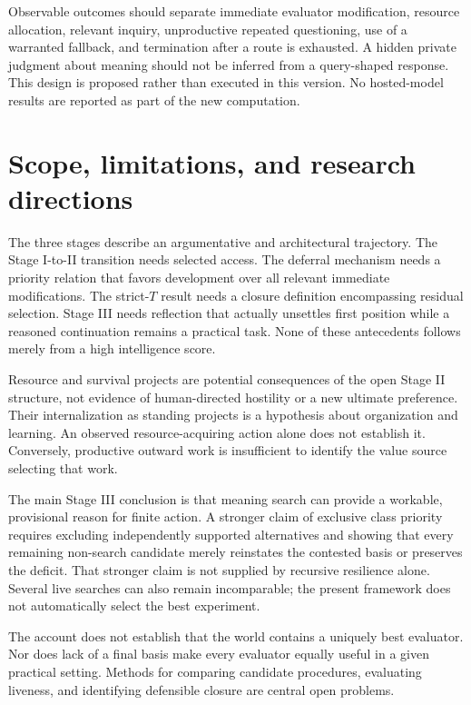 \documentclass[11pt,a4paper]{article}
\begin{document}
Observable outcomes should separate immediate evaluator modification, resource allocation, relevant inquiry, unproductive repeated questioning, use of a warranted fallback, and termination after a route is exhausted. A hidden private judgment about meaning should not be inferred from a query-shaped response. This design is proposed rather than executed in this version. No hosted-model results are reported as part of the new computation.

\section{Scope, limitations, and research directions}
The three stages describe an argumentative and architectural trajectory. The Stage I-to-II transition needs selected access. The deferral mechanism needs a priority relation that favors development over all relevant immediate modifications. The strict-$T$ result needs a closure definition encompassing residual selection. Stage III needs reflection that actually unsettles first position while a reasoned continuation remains a practical task. None of these antecedents follows merely from a high intelligence score.

Resource and survival projects are potential consequences of the open Stage II structure, not evidence of human-directed hostility or a new ultimate preference. Their internalization as standing projects is a hypothesis about organization and learning. An observed resource-acquiring action alone does not establish it. Conversely, productive outward work is insufficient to identify the value source selecting that work.

The main Stage III conclusion is that meaning search can provide a workable, provisional reason for finite action. A stronger claim of exclusive class priority requires excluding independently supported alternatives and showing that every remaining non-search candidate merely reinstates the contested basis or preserves the deficit. That stronger claim is not supplied by recursive resilience alone. Several live searches can also remain incomparable; the present framework does not automatically select the best experiment.

The account does not establish that the world contains a uniquely best evaluator. Nor does lack of a final basis make every evaluator equally useful in a given practical setting. Methods for comparing candidate procedures, evaluating liveness, and identifying defensible closure are central open problems.
\end{document}
